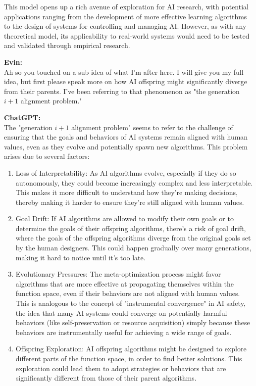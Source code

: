 \documentclass{article}[10pt]
\begin{document}
This model opens up a rich avenue of exploration for AI research, with potential applications ranging from the development of more effective learning algorithms to the design of systems for controlling and managing AI. 
However, as with any theoretical model, its applicability to real-world systems would need to be tested and validated through empirical research.\par


\noindent \textbf{Evin:}\\
Ah so you touched on a sub-idea of what I'm after here. 
I will give you my full idea, but first please speak more on how AI offspring might significantly diverge from their parents. 
I've been referring to that phenomenon as "the generation $ i + 1$ alignment problem."\par


\noindent \textbf{ChatGPT:}\\
    The "generation \(i + 1\) alignment problem" seems to refer to the challenge of ensuring that the goals and behaviors of AI systems remain aligned with human values, even as they evolve and potentially spawn new algorithms. This problem arises due to several factors:
    \begin{enumerate}
        \item Loss of Interpretability: As AI algorithms evolve, especially if they do so autonomously, they could become increasingly complex and less interpretable. This makes it more difficult to understand how they're making decisions, thereby making it harder to ensure they're still aligned with human values.
        \item Goal Drift: If AI algorithms are allowed to modify their own goals or to determine the goals of their offspring algorithms, there's a risk of goal drift, where the goals of the offspring algorithms diverge from the original goals set by the human designers. This could happen gradually over many generations, making it hard to notice until it's too late.
        \item Evolutionary Pressures: The meta-optimization process might favor algorithms that are more effective at propagating themselves within the function space, even if their behaviors are not aligned with human values. This is analogous to the concept of "instrumental convergence" in AI safety, the idea that many AI systems could converge on potentially harmful behaviors (like self-preservation or resource acquisition) simply because these behaviors are instrumentally useful for achieving a wide range of goals.
        \item Offspring Exploration: AI offspring algorithms might be designed to explore different parts of the function space, in order to find better solutions. This exploration could lead them to adopt strategies or behaviors that are significantly different from those of their parent algorithms.
    \end{enumerate}
    
\end{document}
